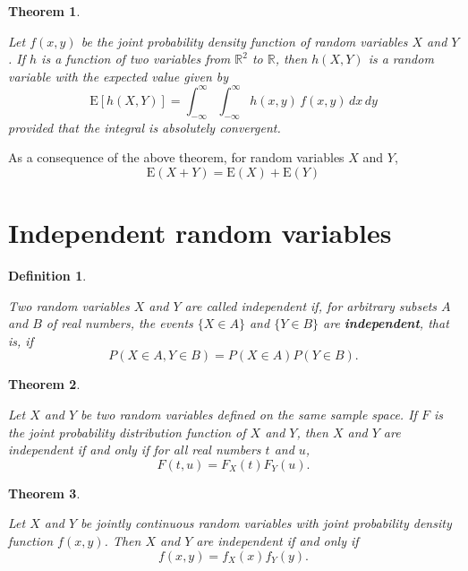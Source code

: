 \documentclass[
]{book}
\newtheorem{theorem}{Theorem}[chapter]
\theoremstyle{definition}
\newtheorem{definition}{Definition}[chapter]
\theoremstyle{definition}
\theoremstyle{definition}
\theoremstyle{definition}
\theoremstyle{remark}
\begin{document}
\begin{theorem}
\protect\hypertarget{thm:unlabeled-div-20}{}\label{thm:unlabeled-div-20}

\emph{Let \(f (x, y)\) be the joint probability density function
of random variables \(X\) and \(Y\). If \(h\) is a function of two variables
from \(\mathbb{R}^2\) to \(\mathbb{R}\), then \(h(X, Y )\) is a random
variable with the expected value given by
\[\mathrm{E}[h(X,Y)] = \int_{-\infty}^{\infty}\int_{-\infty}^{\infty} h(x,y) \, f(x,y)\, dx\, dy\]
provided that the integral is absolutely convergent.}

\end{theorem}

As a consequence of the above theorem, for random variables \(X\) and \(Y\),
\[\mathrm{E}(X + Y) = \mathrm{E}(X) + \mathrm{E}(Y)\]

\hypertarget{independent-random-variables}{%
\section{Independent random variables}\label{independent-random-variables}}

\begin{definition}
\protect\hypertarget{def:unlabeled-div-21}{}\label{def:unlabeled-div-21}

\emph{Two random variables \(X\) and \(Y\) are called
independent if, for arbitrary subsets \(A\) and \(B\) of real numbers, the
events \(\{X \in A\}\) and \(\{Y \in B\}\) are \textbf{independent}, that is, if
\[P(X \in A, Y \in B) = P(X \in A) P(Y \in B).\]}

\end{definition}

\begin{theorem}
\protect\hypertarget{thm:unlabeled-div-22}{}\label{thm:unlabeled-div-22}

\emph{Let \(X\) and \(Y\) be two random variables defined on the
same sample space. If \(F\) is the joint probability distribution function
of \(X\) and \(Y\), then \(X\) and \(Y\) are independent if and only if for all
real numbers \(t\) and \(u\), \[F(t,u)  = F_X(t) F_Y(u).\]}

\end{theorem}

\begin{theorem}
\protect\hypertarget{thm:unlabeled-div-23}{}\label{thm:unlabeled-div-23}

\emph{Let \(X\) and \(Y\) be jointly continuous random variables
with joint probability density function \(f (x, y)\). Then \(X\) and \(Y\) are
independent if and only if \[f (x, y) = f_X(x) f_Y (y).\]}

\end{theorem}
\end{document}
